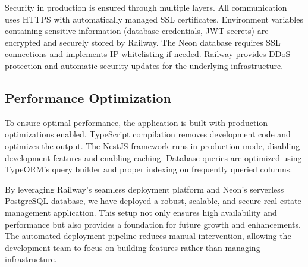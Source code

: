 Security in production is ensured through multiple layers. All communication uses HTTPS with automatically managed SSL certificates. Environment variables containing sensitive information (database credentials, JWT secrets) are encrypted and securely stored by Railway. The Neon database requires SSL connections and implements IP whitelisting if needed. Railway provides DDoS protection and automatic security updates for the underlying infrastructure.

\subsection{Performance Optimization}

To ensure optimal performance, the application is built with production optimizations enabled. TypeScript compilation removes development code and optimizes the output. The NestJS framework runs in production mode, disabling development features and enabling caching. Database queries are optimized using TypeORM's query builder and proper indexing on frequently queried columns.

By leveraging Railway's seamless deployment platform and Neon's serverless PostgreSQL database, we have deployed a robust, scalable, and secure real estate management application. This setup not only ensures high availability and performance but also provides a foundation for future growth and enhancements. The automated deployment pipeline reduces manual intervention, allowing the development team to focus on building features rather than managing infrastructure.
